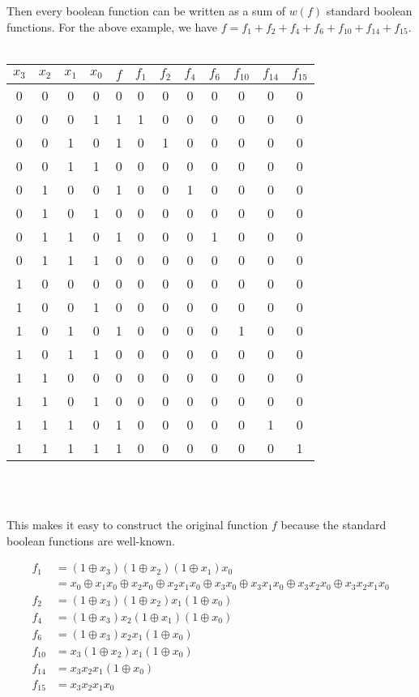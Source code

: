 Then every boolean function can be written as a sum of $w(f)$ standard boolean
functions. For the above example, we have $f=f_1+f_2+f_4+f_6+f_{10}+f_{14}+f_{15}$.
\\
\\
\begin{tabular}{|c|c|c|c|c|c|c|c|c|c|c|c|}
  \hline
  $x_3$&$x_2$&$x_1$&$x_0$&$f$&$f_1$&$f_2$&$f_4$&$f_6$&$f_{10}$&$f_{14}$&$f_{15}$\\
  \hline
  0&0&0&0&0&0&0&0&0&0&0&0\\
  0&0&0&1&1&1&0&0&0&0&0&0\\
  0&0&1&0&1&0&1&0&0&0&0&0\\
  0&0&1&1&0&0&0&0&0&0&0&0\\
  0&1&0&0&1&0&0&1&0&0&0&0\\
  0&1&0&1&0&0&0&0&0&0&0&0\\
  0&1&1&0&1&0&0&0&1&0&0&0\\
  0&1&1&1&0&0&0&0&0&0&0&0\\
  1&0&0&0&0&0&0&0&0&0&0&0\\
  1&0&0&1&0&0&0&0&0&0&0&0\\
  1&0&1&0&1&0&0&0&0&1&0&0\\
  1&0&1&1&0&0&0&0&0&0&0&0\\
  1&1&0&0&0&0&0&0&0&0&0&0\\
  1&1&0&1&0&0&0&0&0&0&0&0\\
  1&1&1&0&1&0&0&0&0&0&1&0\\
  1&1&1&1&1&0&0&0&0&0&0&1\\
  \hline
\end{tabular}
\\
\\
\par This makes it easy to construct the original function $f$ because
the standard boolean functions are well-known.

\begin{align*}
  f_1   &=(1\oplus x_3)(1\oplus x_2)(1\oplus x_1)x_0\\
        &=x_0 \oplus x_1x_0 \oplus x_2x_0 \oplus x_2x_1x_0 \oplus x_3x_0 \oplus x_3x_1x_0
        \oplus x_3x_2x_0 \oplus x_3x_2x_1x_0\\
  f_2   &=(1\oplus x_3)(1\oplus x_2)x_1(1\oplus x_0)\\
  f_4   &=(1\oplus x_3)x_2(1\oplus x_1)(1\oplus x_0)\\
  f_6   &=(1\oplus x_3)x_2x_1(1\oplus x_0)\\
  f_{10}&=x_3(1\oplus x_2)x_1(1\oplus x_0)\\
  f_{14}&=x_3x_2x_1(1\oplus x_0)\\
  f_{15}&=x_3x_2x_1x_0\\
\end{align*}

